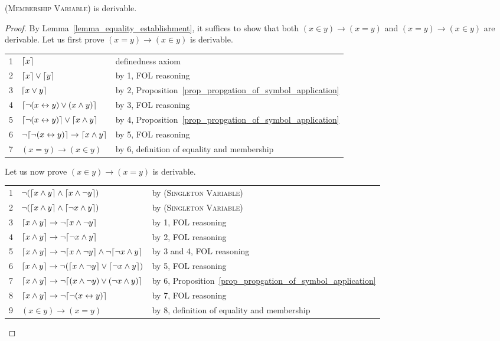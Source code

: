 \documentclass[acmsmall]{acmart}
\theoremstyle{acmdefinition}
\newcommand{\imp}{\to}
\newcommand{\dimp}{\leftrightarrow}
\newcommand{\prule}[1]{\textsc{(#1)}}
\newcommand{\singletonvariable}{\prule{Singleton Variable}\xspace}
\DeclarePairedDelimiter{\ceil}{\lceil}{\rceil}
\newcommand{\Prop}[1]{Proposition~\ref{#1}}
\begin{document}
\begin{lemma}
	\prule{Membership Variable} is derivable.
\end{lemma}
\begin{proof}
	By Lemma~\ref{lemma_equality_establishment},
	it suffices to show that both
	$(x \in y) \imp (x = y)$
	and
	$(x = y) \imp (x \in y)$
	are derivable.
	Let us first prove $(x = y) \imp (x \in y)$ is derivable.

\begin{center}
	\begin{tabular}{l|ll}
		1 & $\ceil{x}$ & definedness axiom \\
		2 & $\ceil{x} \vee \ceil{y}$ & by 1, FOL reasoning \\
		3 & $\ceil{x \vee y}$ 
		  & by 2, \Prop{prop_propgation_of_symbol_application} \\
		4 & $\ceil{\neg (x \dimp y) \vee (x \wedge y)}$
		  & by 3, FOL reasoning \\
		5 & $\ceil{\neg (x \dimp y)} \vee \ceil{x \wedge y}$
		  & by 4, \Prop{prop_propgation_of_symbol_application} \\
		6 & $\neg \ceil{\neg (x \dimp y)} \imp \ceil{x \wedge y} $
		  & by 5, FOL reasoning \\
		7 & $(x = y) \imp (x \in y)$ 
		  & by 6, definition of equality and membership
	\end{tabular}
\end{center}

Let us now prove 	$(x \in y) \imp (x = y)$ is derivable.

\begin{center}
	\begin{tabular}{l|ll}
		1 & $\neg (\ceil{x \wedge y} \wedge \ceil{x \wedge \neg y})$ 
		  & by \singletonvariable \\
		2 & $\neg (\ceil{x \wedge y} \wedge \ceil{\neg x \wedge y})$ 
		  & by \singletonvariable \\
		3 & $\ceil{x \wedge y} \imp \neg \ceil{x \wedge \neg y}$
		  & by 1, FOL reasoning\\
		4 & $\ceil{x \wedge y} \imp \neg \ceil{\neg x \wedge y}$
		  & by 2, FOL reasoning \\
		5 & $\ceil{x \wedge y} \imp
		     \neg \ceil{x \wedge \neg y} \wedge
		     \neg \ceil{\neg x \wedge y}$
		  & by 3 and 4, FOL reasoning\\
		6 & $\ceil{x \wedge y} \imp
		  \neg (\ceil{x \wedge \neg y} \vee
		        \ceil{\neg x \wedge y})$
		  & by 5, FOL reasoning \\
		7 & $\ceil{x \wedge y} \imp 
		      \neg \ceil{(x \wedge \neg y) \vee (\neg x \wedge y)} $
		  & by 6, \Prop{prop_propgation_of_symbol_application} \\
		8 & $\ceil{x \wedge y} \imp 
		     \neg \ceil{\neg (x \dimp y)} $
		  & by 7, FOL reasoning\\
		9 & $(x \in y) \imp (x = y)$
		  & by 8, definition of equality and membership
	\end{tabular}
\end{center}

\end{proof}
\end{document}
